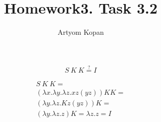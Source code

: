 \documentclass{article}
\title{Homework3. Task 3.2}
\author{Artyom Kopan}
\begin{document}
\huge
\maketitle

\[
S\:K\:K \overset{?}{=} I
\]

\begin{gather}
S\:K\:K =\\ (\lambda x.\lambda y.\lambda z.xz(yz)) K K =\\ (\lambda y.\lambda z.Kz(yz)) K =\\ (\lambda y.\lambda z.z) K = \lambda z.z = I
\end{gather}
\end{document}

